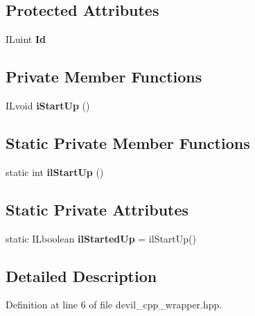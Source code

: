 \subsection*{Protected Attributes}
\begin{DoxyCompactItemize}
\item 
\mbox{\label{classilImage_aa996de45b5143a4ef96b5f25026e3551}} 
I\+Luint {\bfseries Id}
\end{DoxyCompactItemize}
\subsection*{Private Member Functions}
\begin{DoxyCompactItemize}
\item 
\mbox{\label{classilImage_aea44c117dc8642751f7a5d698339e56c}} 
I\+Lvoid {\bfseries i\+Start\+Up} ()
\end{DoxyCompactItemize}
\subsection*{Static Private Member Functions}
\begin{DoxyCompactItemize}
\item 
\mbox{\label{classilImage_a5668e1d2ecab83f67b8214095b48847a}} 
static int {\bfseries il\+Start\+Up} ()
\end{DoxyCompactItemize}
\subsection*{Static Private Attributes}
\begin{DoxyCompactItemize}
\item 
\mbox{\label{classilImage_ae09e3eda5b2ee8bcfbd12606f71bf4f2}} 
static I\+Lboolean {\bfseries il\+Started\+Up} = il\+Start\+Up()
\end{DoxyCompactItemize}


\subsection{Detailed Description}


Definition at line 6 of file devil\+\_\+cpp\+\_\+wrapper.\+hpp.



